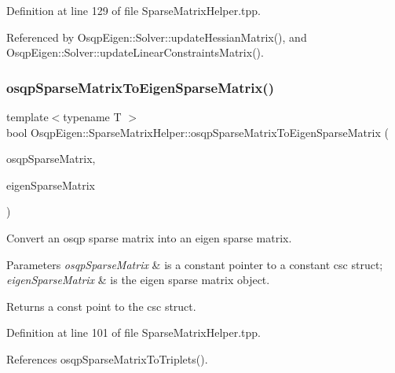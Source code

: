 Definition at line 129 of file Sparse\+Matrix\+Helper.\+tpp.



Referenced by Osqp\+Eigen\+::\+Solver\+::update\+Hessian\+Matrix(), and Osqp\+Eigen\+::\+Solver\+::update\+Linear\+Constraints\+Matrix().

\mbox{\label{namespaceOsqpEigen_1_1SparseMatrixHelper_aec1a2210ce843eda8e4000c81d886131}} 
\subsubsection{\texorpdfstring{osqp\+Sparse\+Matrix\+To\+Eigen\+Sparse\+Matrix()}{osqpSparseMatrixToEigenSparseMatrix()}}
{\footnotesize\ttfamily template$<$typename T $>$ \\
bool Osqp\+Eigen\+::\+Sparse\+Matrix\+Helper\+::osqp\+Sparse\+Matrix\+To\+Eigen\+Sparse\+Matrix (\begin{DoxyParamCaption}\item[{const csc $\ast$const \&}]{osqp\+Sparse\+Matrix,  }\item[{Eigen\+::\+Sparse\+Matrix$<$ T $>$ \&}]{eigen\+Sparse\+Matrix }\end{DoxyParamCaption})}



Convert an osqp sparse matrix into an eigen sparse matrix. 


\begin{DoxyParams}{Parameters}
{\em osqp\+Sparse\+Matrix} & is a constant pointer to a constant csc struct; \\
\hline
{\em eigen\+Sparse\+Matrix} & is the eigen sparse matrix object. \\
\hline
\end{DoxyParams}
\begin{DoxyReturn}{Returns}
a const point to the csc struct. 
\end{DoxyReturn}


Definition at line 101 of file Sparse\+Matrix\+Helper.\+tpp.



References osqp\+Sparse\+Matrix\+To\+Triplets().

\mbox{\label{namespaceOsqpEigen_1_1SparseMatrixHelper_af45a1d77519f691542150e506b6dcdeb}} 
